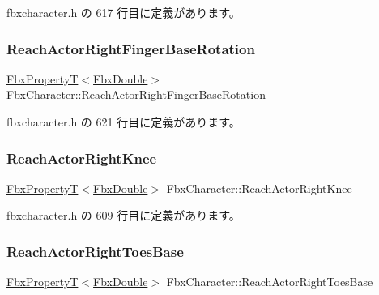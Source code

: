  fbxcharacter.\+h の 617 行目に定義があります。

\mbox{\label{class_fbx_character_a30a72ece789a2f2bfb05d6d880864ead}} 
\subsubsection{\texorpdfstring{Reach\+Actor\+Right\+Finger\+Base\+Rotation}{ReachActorRightFingerBaseRotation}}
{\footnotesize\ttfamily \hyperlink{class_fbx_property_t}{Fbx\+PropertyT}$<$\hyperlink{fbxtypes_8h_a171e72a1c46fc15c1a6c9c31948c1c5b}{Fbx\+Double}$>$ Fbx\+Character\+::\+Reach\+Actor\+Right\+Finger\+Base\+Rotation}



 fbxcharacter.\+h の 621 行目に定義があります。

\mbox{\label{class_fbx_character_a6d6fa21a105a213580ce1e578a6ae1b0}} 
\subsubsection{\texorpdfstring{Reach\+Actor\+Right\+Knee}{ReachActorRightKnee}}
{\footnotesize\ttfamily \hyperlink{class_fbx_property_t}{Fbx\+PropertyT}$<$\hyperlink{fbxtypes_8h_a171e72a1c46fc15c1a6c9c31948c1c5b}{Fbx\+Double}$>$ Fbx\+Character\+::\+Reach\+Actor\+Right\+Knee}



 fbxcharacter.\+h の 609 行目に定義があります。

\mbox{\label{class_fbx_character_a837e3aeaad970205dea5a25bd4382c21}} 
\subsubsection{\texorpdfstring{Reach\+Actor\+Right\+Toes\+Base}{ReachActorRightToesBase}}
{\footnotesize\ttfamily \hyperlink{class_fbx_property_t}{Fbx\+PropertyT}$<$\hyperlink{fbxtypes_8h_a171e72a1c46fc15c1a6c9c31948c1c5b}{Fbx\+Double}$>$ Fbx\+Character\+::\+Reach\+Actor\+Right\+Toes\+Base}



